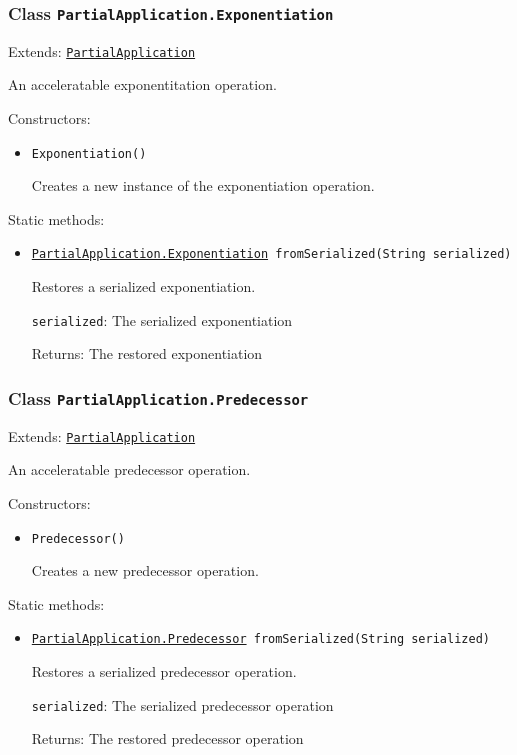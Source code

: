 \subsubsection{Class \texttt{PartialApplication.Exponentiation}}
\label{type:edu.kit.wavelength.client.model.term.PartialApplication.Exponentiation}
Extends: \texttt{\hyperref[type:edu.kit.wavelength.client.model.term.PartialApplication]{PartialApplication}}

An acceleratable exponentitation operation.

Constructors:
\begin{itemize}
\item \texttt{Exponentiation()}

Creates a new instance of the exponentiation operation.

\end{itemize}

Static methods:
\begin{itemize}
\item \texttt{\hyperref[type:edu.kit.wavelength.client.model.term.PartialApplication.Exponentiation]{PartialApplication.Exponentiation} fromSerialized(String serialized)}

Restores a serialized exponentiation.

\texttt{serialized}: The serialized exponentiation

Returns: The restored exponentiation

\end{itemize}

\subsubsection{Class \texttt{PartialApplication.Predecessor}}
\label{type:edu.kit.wavelength.client.model.term.PartialApplication.Predecessor}
Extends: \texttt{\hyperref[type:edu.kit.wavelength.client.model.term.PartialApplication]{PartialApplication}}

An acceleratable predecessor operation.

Constructors:
\begin{itemize}
\item \texttt{Predecessor()}

Creates a new predecessor operation.

\end{itemize}

Static methods:
\begin{itemize}
\item \texttt{\hyperref[type:edu.kit.wavelength.client.model.term.PartialApplication.Predecessor]{PartialApplication.Predecessor} fromSerialized(String serialized)}

Restores a serialized predecessor operation.

\texttt{serialized}: The serialized predecessor operation

Returns: The restored predecessor operation

\end{itemize}

